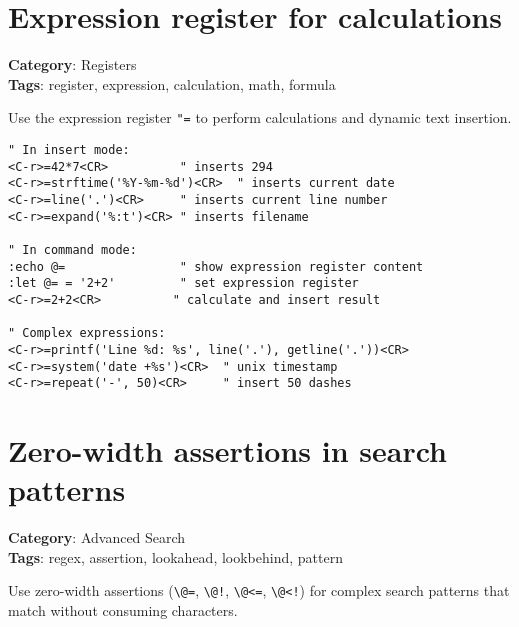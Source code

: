 \section{Expression register for calculations}

\textbf{Category}: Registers\\ \textbf{Tags}: register, expression, calculation, math, formula
\vspace{0.5cm}

Use the expression register {\footnotesize \Verb§"=§} to perform calculations and dynamic text insertion.

\begin{Exa*}{}
\begin{Verbatim}[fontsize=\footnotesize, breaklines, breakanywhere]
" In insert mode:
<C-r>=42*7<CR>          " inserts 294
<C-r>=strftime('%Y-%m-%d')<CR>  " inserts current date
<C-r>=line('.')<CR>     " inserts current line number
<C-r>=expand('%:t')<CR> " inserts filename

" In command mode:
:echo @=                " show expression register content
:let @= = '2+2'         " set expression register
<C-r>=2+2<CR>          " calculate and insert result

" Complex expressions:
<C-r>=printf('Line %d: %s', line('.'), getline('.'))<CR>
<C-r>=system('date +%s')<CR>  " unix timestamp
<C-r>=repeat('-', 50)<CR>     " insert 50 dashes
\end{Verbatim}
\end{Exa*}

\section{Zero-width assertions in search patterns}

\textbf{Category}: Advanced Search\\ \textbf{Tags}: regex, assertion, lookahead, lookbehind, pattern
\vspace{0.5cm}

Use zero-width assertions ({\footnotesize \Verb§\@=§}, {\footnotesize \Verb§\@!§}, {\footnotesize \Verb§\@<=§}, {\footnotesize \Verb§\@<!§}) for complex search patterns that match without consuming characters.

